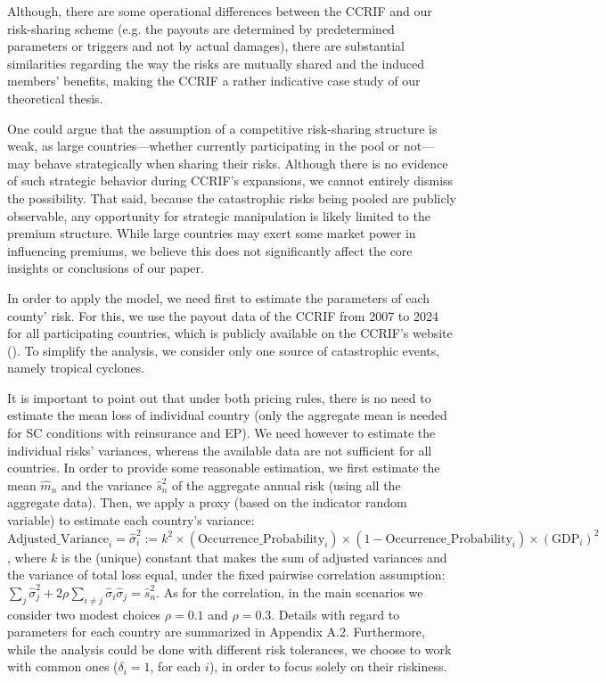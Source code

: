 \documentclass[fleqn,mnsc,nonblindrev]{informs4}
\begin{document}
Although, there are some operational differences between the CCRIF and our risk-sharing scheme (e.g. the payouts are determined by predetermined parameters or triggers and not by actual damages), there are substantial similarities regarding the way the risks are mutually shared and the induced members' benefits, making the CCRIF a rather indicative case study of our theoretical thesis. 

One could argue that the assumption of a competitive risk-sharing structure is weak, as large countries—whether currently participating in the pool or not—may behave strategically when sharing their risks. Although there is no evidence of such strategic behavior during CCRIF’s expansions, we cannot entirely dismiss the possibility. That said, because the catastrophic risks being pooled are publicly observable, any opportunity for strategic manipulation is likely limited to the premium structure. While large countries may exert some market power in influencing premiums, we believe this does not significantly affect the core insights or conclusions of our paper.

In order to apply the model, we need first to estimate the parameters of each county' risk. For this, we use the payout data of the CCRIF from 2007 to 2024 for all participating countries, which is publicly available on the CCRIF's website (\cite{ccrif_payouts}). To simplify the analysis, we consider only one source of catastrophic events, namely tropical cyclones. 

It is important to point out that under both pricing rules, there is no need to estimate the mean loss of individual country (only the aggregate mean is needed for SC conditions with reinsurance and EP). We need however to estimate the individual risks' variances, whereas the available data are not sufficient for all countries. In order to provide some reasonable estimation, we first estimate the mean $\hat{m}_n$ and the variance $\hat{s}_n^2$ of the aggregate annual risk (using all the aggregate data). Then, we apply a proxy (based on the indicator random variable) to estimate each country's variance: $\text{Adjusted\_Variance}_i =\hat{\sigma}_i^2:= k^2 \times \left(\text{Occurrence\_Probability}_i\right)\times \left(1-\text{Occurrence\_Probability}_i\right) \times \left(\text{GDP}_i\right)^2$, where $k$ is the (unique) constant that makes the sum of adjusted variances and the variance of total loss equal, under the fixed pairwise correlation assumption: $\sum_{j}\hat{\sigma}_j^2+2\rho\sum_{i\neq j}\hat{\sigma}_i\hat{\sigma}_j= \hat{s}_n^2$. As for the correlation, in the main scenarios we consider two modest choices $\rho=0.1$ and $\rho=0.3$. Details with regard to parameters for each country are summarized in Appendix A.2. Furthermore, while the analysis could be done with different risk tolerances, we choose to work with common ones ($\delta_i=1$, for each $i$), in order to focus solely on their riskiness. 
\end{document}
